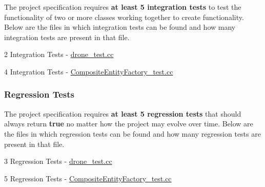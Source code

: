 The project specification requires {\bfseries at least 5 integration tests} to test the functionality of two or more classes working together to create functionality. Below are the files in which integration tests can be found and how many integration tests are present in that file.
\begin{DoxyItemize}
\item 2 Integration Tests -\/ {\ttfamily \hyperlink{drone__test_8cc}{drone\+\_\+test.\+cc}}
\item 4 Integration Tests -\/ {\ttfamily \hyperlink{CompositeEntityFactory__test_8cc}{Composite\+Entity\+Factory\+\_\+test.\+cc}}
\end{DoxyItemize}

\subsubsection*{Regression Tests}

The project specification requires {\bfseries at least 5 regression tests} that should always return {\bfseries true} no matter how the project may evolve over time. Below are the files in which regression tests can be found and how many regression tests are present in that file.
\begin{DoxyItemize}
\item 3 Regression Tests -\/ {\ttfamily \hyperlink{drone__test_8cc}{drone\+\_\+test.\+cc}}
\item 5 Regression Tests -\/ {\ttfamily \hyperlink{CompositeEntityFactory__test_8cc}{Composite\+Entity\+Factory\+\_\+test.\+cc}} 
\end{DoxyItemize}
